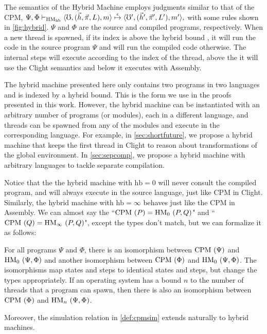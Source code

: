 The semantics of the Hybrid Machine employs judgments similar to that of the CPM,
$ \Psi, \Phi \vdash_\mathrm{HM_{hb}}
\langle\mho, (\vec{h}, \vec{\pi}, L), m \rangle
\stackrel{\epsilon}\mapsto     \langle\mho', (\vec{h}', \vec{\pi}',
  L'), m' \rangle, $
with some rules shown in \cref{fig:hybrid}. $\Psi$ and  $\Phi$ are the source and compiled programs, respectively. 
When a new thread is spawned, if its index is above the hybrid bound , 
it will run the code in the source program $\Psi$ and will run the compiled code otherwise. 
The internal steps will execute according to the index of the thread, above the  
it will use the Clight semantics and below it executes with Assembly.

The hybrid machine presented here only contains two programs in two languages and is indexed by a hybrid bound. This is the form we use in the proofs presented in this work. However, the hybrid machine can be instantiated with an arbitrary number of programs (or modules), each in a different language, and threads can be spawned from any of the modules and execute in the corresponding language. For example, in \cref{sec:shortfuture}, we propose a hybrid machine that keeps the first thread in Clight to reason about transformations of the global environment. In \cref{sec:sepcomp}, we propose a hybrid machine with arbitrary languages to tackle separate compilation. 

Notice that the the hybrid machine with $\text{hb} = 0$ will never consult the compiled program, and will always execute in the source language, just like CPM in Clight. Similarly, the hybrid machine with $\text{hb} = \infty$ behaves just like the CPM in Assembly. We can almost say the ``$\text{CPM}\ (P)=\text{HM}_0\ (P,Q)$" and ``$\text{CPM}\ (Q)=\text{HM}_{\infty}\ (P,Q)$", except the types don't match, but we can formalize it as follows:

\begin{remark}\label{thm:hybridiso} For all programs $\Psi$ and $\Phi$, there is an isomorphism between $\CPM\ (\Psi)$ and $\HM_0\ (\Psi,\Phi)$ and another isomorphism between $\CPM\ (\Phi)$ and $\HM_0\ (\Psi,\Phi)$. The isomorphisms map states and steps to identical states and steps, but change the types appropriately. If an operating system has a bound $n$ to the number of threads that a program can spawn, then there is also an isomorphism between $\CPM\ (\Phi)$ and $\text{HM}_n\ (\Psi,\Phi)$.

Moreover, the simulation relation in \cref{def:cpmsim} extends naturally to hybrid machines.
\end{remark}

